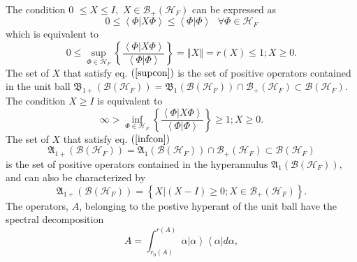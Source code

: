 \documentclass[aps,preprint]{revtex4}%
\begin{document}
The condition $0$ $\leq X\leq I,$ $X\in\mathcal{B}_{+}\left(  \mathcal{H}%
_{F}\right)  $ can be expressed as
\begin{equation}
0\leq\left\langle \left.  \Phi\right\vert X\Phi\right\rangle \leq\left\langle
\left.  \Phi\right\vert \Phi\right\rangle \text{ }\forall\Phi\in
\mathcal{H}_{F}%
\end{equation}
which is equivalent to
\begin{equation}
0\leq\sup_{\Phi\in\mathcal{H}_{F}}\left\{  \frac{\left\langle \left.
\Phi\right\vert X\Phi\right\rangle }{\left\langle \left.  \Phi\right\vert
\Phi\right\rangle }\right\}  =\left\Vert X\right\Vert =r\left(  X\right)
\leq1;X\geq0. \label{supcon}%
\end{equation}
The set of $X$ that satisfy eq. $\left(  \ref{supcon}\right)  $ is the set of
positive operators contained in the unit ball $\mathfrak{B}_{1+}\left(
\mathcal{B}\left(  \mathcal{H}_{F}\right)  \right)  =\mathfrak{B}_{1}\left(
\mathcal{B}\left(  \mathcal{H}_{F}\right)  \right)  \cap\mathcal{B}_{+}\left(
\mathcal{H}_{F}\right)  \subset\mathcal{B}\left(  \mathcal{H}_{F}\right)  .$
The condition $X\geq I$ is equivalent to
\begin{equation}
\infty>\inf_{\Phi\in\mathcal{H}_{F}}\left\{  \frac{\left\langle \left.
\Phi\right\vert X\Phi\right\rangle }{\left\langle \left.  \Phi\right\vert
\Phi\right\rangle }\right\}  \geq1;X\geq0. \label{infcon}%
\end{equation}
The set of $X$ that satisfy eq. $\left(  \ref{infcon}\right)  $%
\begin{equation}
\mathfrak{A}_{1+}\left(  \mathcal{B}\left(  \mathcal{H}_{F}\right)  \right)
=\mathfrak{A}_{1}\left(  \mathcal{B}\left(  \mathcal{H}_{F}\right)  \right)
\cap\mathcal{B}_{+}\left(  \mathcal{H}_{F}\right)  \subset\mathcal{B}\left(
\mathcal{H}_{F}\right)
\end{equation}
is the set of positive operators contained in the hyperannulus $\mathfrak{A}%
_{1}\left(  \mathcal{B}\left(  \mathcal{H}_{F}\right)  \right)  ,$ and can
also be characterized by
\begin{equation}
\mathfrak{A}_{1+}\left(  \mathcal{B}\left(  \mathcal{H}_{F}\right)  \right)
=\left\{  \left.  X\right\vert \left(  X-I\right)  \geq0;X\in\mathcal{B}%
_{+}\left(  \mathcal{H}_{F}\right)  \right\}  .
\end{equation}
The operators, $A$, belonging to the postive hyperant of the unit ball have
the spectral decomposition
\begin{equation}
A=\int_{r_{0}\left(  A\right)  }^{r\left(  A\right)  }\alpha\left\vert
\alpha\right\rangle \left\langle \alpha\right\vert d\alpha,
\end{equation}
\end{document}
